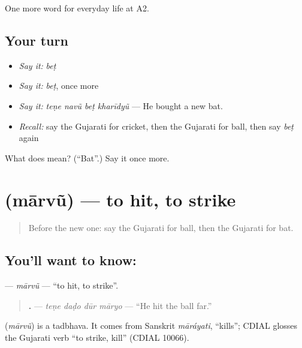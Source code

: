 \begin{grammarlens}[title={What you've built}]
One more word for everyday life at A2.
\end{grammarlens}

\subsection*{Your turn}
\begin{itemize}
\raggedright
  \item \emph{Say it:} \emph{beṭ}
  \item \emph{Say it:} \emph{beṭ}, once more
  \item \emph{Say it:} \emph{teṇe navũ beṭ kharīdyũ} — He bought a new bat.
  \item \emph{Recall:} say the Gujarati for cricket, then the Gujarati for ball, then say \emph{beṭ} again
\end{itemize}

\begin{tcolorbox}[breakable,colback=teal!4,colframe=teal!35!black,title={Before you move on}]
What does  mean? (\textquotedblleft{}Bat\textquotedblright{}.) Say it once more.
\end{tcolorbox}
\section[\texorpdfstring{\gu{મારવું} (mārvũ)}{મારવું (mārvũ)}]{ (mārvũ) — to hit, to strike}

\label{lesson:GU-C258-maarvu}



\begin{quote}
Before the new one: say the Gujarati for ball, then the Gujarati for bat.
\end{quote}

\subsection*{You'll want to know: }
\textbf{} — \emph{mārvũ} — \textquotedblleft{}to hit, to strike\textquotedblright{}.

\begin{quote}
\textbf{   .} — \emph{teṇe daḍo dūr māryo} — \textquotedblleft{}He hit the ball far.\textquotedblright{}
\end{quote}

\begin{cousinweb}
\textbf{} (\emph{mārvũ}) is a tadbhava. It comes from Sanskrit \emph{māráyati}, \textquotedblleft{}kills\textquotedblright{}; CDIAL glosses the Gujarati verb \textquotedblleft{}to strike, kill\textquotedblright{} (CDIAL 10066).
\end{cousinweb}

